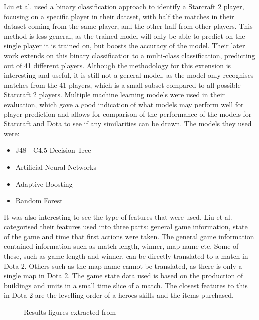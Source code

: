 \documentclass[Report.tex]{subfiles}
\begin{document}
Liu et al. \cite{starcraft-identification} used a binary classification approach to identify a Starcraft 2 player, focusing on a specific player in their dataset, with half the matches in their dataset coming from the same player, and the other half from other players. This method is less general, as the trained model will only be able to predict on the single player it is trained on, but boosts the accuracy of the model. Their later work \cite{starcraft-actions} extends on this binary classification to a multi-class classification, predicting out of 41 different players. Although the methodology for this extension is interesting and useful, it is still not a general model, as the model only recognises matches from the 41 players, which is a small subset compared to all possible Starcraft 2 players. Multiple machine learning models were used in their evaluation, which gave a good indication of what models may perform well for player prediction and allows for comparison of the performance of the models for Starcraft and Dota to see if any similarities can be drawn. The models they used were:
\begin{itemize}
\item J48 - C4.5 Decision Tree
\item Artificial Neural Networks
\item Adaptive Boosting
\item Random Forest
\end{itemize}
It was also interesting to see the type of features that were used. Liu et al. categorised their features used into three parts: general game information, state of the game and time that first actions were taken. The general game information contained information such as match length, winner, map name etc. Some of these, such as game length and winner, can be directly translated to a match in Dota 2. Others such as the map name cannot be translated, as there is only a single map in Dota 2. The game state data used is based on the production of buildings and units in a small time slice of a match. The closest features to this in Dota 2 are the levelling order of a heroes skills and the items purchased. 

\begin{figure}[H]
\centering
\begin{subfigure}{0.45\textwidth}
\end{subfigure}
\hspace{\fill}
\begin{subfigure}{0.45\textwidth}
\end{subfigure}
\caption{Results figures extracted from \cite{starcraft-identification}}
\label{fig:sc2-results}
\end{figure}
\end{document}
